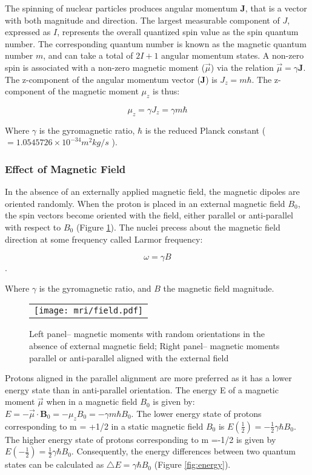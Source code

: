 The spinning of nuclear particles produces angular momentum  $\textbf{J}$, that is a vector with both magnitude and direction. The largest measurable component of $J$, expressed as $I$, represents the overall quantized spin value as the spin quantum number. The corresponding quantum number is known as the magnetic quantum number $m$, and can take a total of $2I + 1$ angular momentum states.  A non-zero spin is associated with a non-zero magnetic moment ($\vec{\mu}$) via the relation $\vec{\mu} =\gamma \textbf{J}$. The z-component of the angular momentum vector (\textbf{J}) is $J_z = m \hbar$. The z-component of the magnetic moment $\mu_z$ is thus: 

$$\mu_z=\gamma J_z=\gamma m \hbar$$

Where $\gamma$ is the gyromagnetic ratio, $\hbar$ is the reduced Planck constant ($=1.0545726 \times 10^{-34} m^2kg/s$ ).

\subsubsection{Effect of Magnetic Field}

In the absence of an externally applied magnetic field, the magnetic dipoles are oriented randomly. When the proton is placed in an external magnetic field $B_0$, the spin vectors become oriented with the field, either parallel or anti-parallel with respect to $B_0$ (Figure \ref{fig:externalB0}). The nuclei precess about the magnetic field direction at some frequency called Larmor frequency: 

$$\omega = \gamma B$$.

Where $\gamma$ is the gyromagnetic ratio, and $B$ the magnetic field magnitude.


\begin{figure}[htb]
\begin{center}
\begin{tabular}{c}
\texttt{[image: mri/field.pdf]}
\end{tabular}
\caption{Left panel-- magnetic moments with random orientations in the absence of external magnetic field; Right panel-- magnetic moments parallel or anti-parallel aligned with the external
field} \label{fig:externalB0}
\end{center}
\end{figure}

Protons aligned in the parallel alignment are more preferred as it has a lower energy state than in anti-parallel orientation. The energy E of a magnetic moment $\vec{\mu}$ when in a magnetic field $B_0$ is given by: $E=-\vec{\mu}\cdot \textbf{B}_0=-\mu_z B_0=-\gamma m \hbar B_0$. The lower energy state of protons corresponding to m = +1/2 in a static magnetic field $B_0$ is $E(\frac{1}{2})=-\frac{1}{2}\gamma \hbar B_0$. The higher energy state of protons corresponding to m =-1/2 is given by $E(-\frac{1}{2})=\frac{1}{2}\gamma \hbar B_0$.
Consequently, the energy differences between two quantum states can be calculated as $\bigtriangleup E = \gamma \hbar B_0$ (Figure \ref{fig:energy}).

